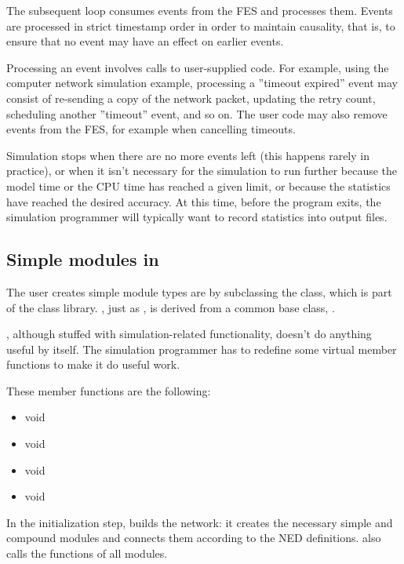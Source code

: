 The subsequent loop consumes events from the FES and processes 
them. Events are processed in strict timestamp order in order 
to maintain causality, that is, to ensure that no event may have 
an effect on earlier events.

Processing an event involves calls to user-supplied code. For example,
using the computer network simulation example, processing a ''timeout
expired'' event may consist of re-sending a copy of the network
packet, updating the retry count, scheduling another ''timeout''
event, and so on. The user code may also remove events from the FES,
for example when cancelling timeouts.

Simulation stops when there are no more events left (this happens 
rarely in practice), or when it isn't necessary for the simulation 
to run further because the model time or the CPU time has reached 
a given limit, or because the statistics have reached the desired 
accuracy. At this time, before the program exits, the simulation 
programmer will typically want to record statistics into output 
files.





\subsection{Simple modules in {\opp}}

The user creates simple module types are by
subclassing the 
class, which is part of the {\opp} class library.
, just as , is derived
from a common base class, .

, although stuffed with simulation-related
functionality, doesn't do anything useful by itself. The simulation
programmer has to redefine some virtual member functions to make it do
useful work.


These member functions are the following:
\begin{itemize}
  \item{void }
  \item{void }
  \item{void }
  \item{void }
\end{itemize}

In the initialization step, {\opp} builds the network: it creates the
necessary simple and compound modules and
connects them according to the NED definitions. {\opp} also calls the
 functions of all modules.

